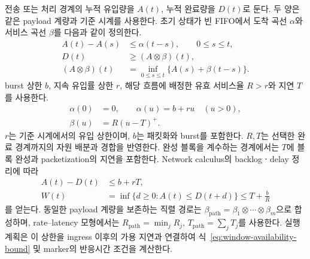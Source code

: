 전송 또는 처리 경계의 누적 유입량을 $A(t)$, 누적 완료량을 $D(t)$로 둔다.
두 양은 같은 payload 계량과 기준 시계를 사용한다.
초기 상태가 빈 FIFO에서 도착 곡선 $\alpha$와 서비스 곡선 $\beta$를 다음과 같이 정의한다.
\begin{equation}
 \begin{aligned}
 A(t)-A(s)&\le\alpha(t-s),\qquad 0\le s\le t,\\
 D(t)&\ge(A\otimes\beta)(t),\\
 (A\otimes\beta)(t)&=
       \inf_{0\le s\le t}\{A(s)+\beta(t-s)\}.
 \end{aligned}
 \label{eq:network-curves}
\end{equation}
burst 상한 $b$, 지속 유입률 상한 $r$,
해당 흐름에 배정한 유효 서비스율 $R>r$와 지연 $T$를 사용한다.
\begin{equation}
 \begin{aligned}
 \alpha(0)&=0,\qquad \alpha(u)=b+ru\quad(u>0),\\
 \beta(u)&=R(u-T)^+.
 \end{aligned}
 \label{eq:rate-latency}
\end{equation}
$r$는 기준 시계에서의 유입 상한이며, $b$는 패킷화와 burst를 포함한다.
$R,T$는 선택한 완료 경계까지의 자원 배분과 경합을 반영한다.
완성 블록을 계수하는 경계에서는 $T$에 블록 완성과 packetization의 지연을 포함한다.
Network calculus의 backlogㆍdelay 정리에 따라\citep{networkcalculus}
\begin{equation}
 \begin{aligned}
 A(t)-D(t)&\le b+rT,\\
 W(t)&=\inf\{d\ge0:A(t)\le D(t+d)\}
          \le T+\frac bR
 \end{aligned}
 \label{eq:network-bounds}
\end{equation}
를 얻는다. 동일한 payload 계량을 보존하는 직렬 경로는
$\beta_{\mathrm{path}}=\beta_1\otimes\cdots\otimes\beta_m$으로 합성하며,
rate--latency 모형에서는
$R_{\mathrm{path}}=\min_jR_j$,
$T_{\mathrm{path}}=\sum_jT_j$를 사용한다.
실행 계획은 이 상한을 ingress 이후의 가용 지연과 연결하여
식~\eqref{eq:window-availability-bound} 및 marker의 반응시간 조건을 계산한다.
